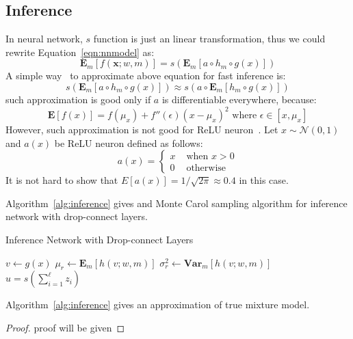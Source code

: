 \documentclass[9pt]{article}
\begin{document}
\subsection{Inference}
\label{sec:inference}
In neural network, $s$ function is just an linear transformation, 
thus we could rewrite
Equation~\ref{eqn:nnmodel} as:
$$
\mathbf{E}_m[f(\mathbf{x};w,m)]=s(\mathbf{E}_m[a\circ h_m\circ g(x)])
$$
A simple way~\cite{hinton2012} to approximate above equation for fast inference is:
$$
s(\mathbf{E}_m[a\circ h_m\circ g(x)])\approx
s(a\circ \mathbf{E}_m[h_m\circ g(x)])
$$
such approximation is good only if $a$ is differentiable everywhere, because:
$$
\mathbf{E}[f(x)] = f(\mu_x) + f''(\epsilon)(x-\mu_x)^2 \mbox{ where  } \epsilon\in [x,\mu_x]
$$
However, such approximation is not good for ReLU neuron~\cite{Nair2010}. 
Let $x\sim \mathcal{N}(0,1)$ and $a(x)$ be ReLU neuron defined as follows:
$$
a(x)=\left\{
    \begin{array}{ll}
        x & \mbox{ when } x>0\\
        0 & \mbox{ otherwise}
    \end{array}
    \right.
$$
It is not hard to show that $E[a(x)]=1/\sqrt{2\pi}\approx 0.4$ in this case.

Algorithm~\ref{alg:inference} gives and Monte Carol sampling algorithm 
for inference network with drop-connect layers.
\begin{algorithm}[ht]
    \label{alg:inference}
    \caption{Inference Network with Drop-connect Layers }
    $v\leftarrow g(x)$\;
    $\mu_r\leftarrow \mathbf{E}_m[h(v;w,m)]$\;
    $\sigma_r^2\leftarrow {\mathbf{Var}_m[h(v;w,m)]}$\;
    $u=s(\sum_{i=1}^{\ell} z_i)$\;
\end{algorithm}
\begin{theorem}
    \label{thm:inference}
    Algorithm~\ref{alg:inference} gives an approximation of true mixture model.
\end{theorem}
\begin{proof}
    proof will be given
\end{proof}

\end{document}
